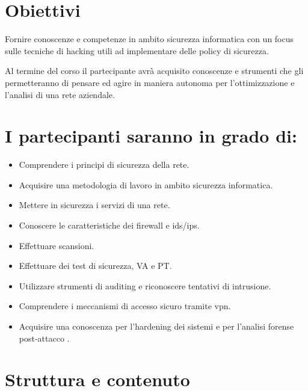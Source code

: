 \section{Obiettivi}
Fornire conoscenze e competenze in ambito sicurezza informatica con un focus sulle
tecniche di hacking utili ad implementare delle policy di sicurezza.

Al termine del corso il partecipante avrà acquisito conoscenze e strumenti che gli permetteranno di
pensare ed agire in maniera autonoma per l'ottimizzazione e l'analisi di una rete aziendale.

\section{I partecipanti saranno in grado di:}

\begin{itemize}
\item Comprendere i principi di sicurezza della rete.
\item Acquisire una metodologia di lavoro in ambito sicurezza informatica.
\item Mettere in sicurezza i servizi di una rete.
\item Conoscere le caratteristiche dei firewall e ids/ips.
\item Effettuare scansioni.
\item Effettuare dei test di sicurezza, VA e PT.
\item Utilizzare strumenti di auditing e riconoscere tentativi di intrusione.
\item Comprendere i meccanismi di accesso sicuro tramite vpn.
\item Acquisire una conoscenza per l'hardening dei sistemi e per l'analisi forense post-attacco .
\end{itemize}

\section{Struttura e contenuto}

